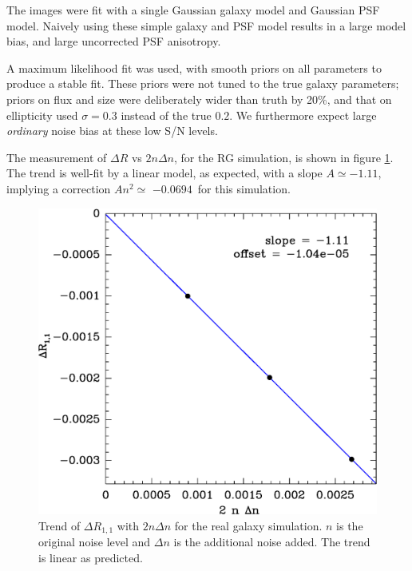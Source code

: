 \documentclass[usegraphicx,usenatbib]{mn2e}
\newcommand{\Aslope}{$-1.11$}
\newcommand{\Rcorr}{$-0.0694$}
\begin{document}
The images were fit with a single Gaussian galaxy model and Gaussian PSF model.
Naively using these simple galaxy and PSF model results in a large model bias,
and large uncorrected PSF anisotropy.

A maximum likelihood fit was used, with smooth priors on all parameters to
produce a stable fit.  These priors were not tuned to the true galaxy
parameters; priors on flux and size were deliberately wider than truth by 20\%,
and that on ellipticity used $\sigma=0.3$ instead of the true $0.2$.  We
furthermore expect large {\em ordinary} noise bias at these low S/N levels.

The measurement of $\Delta R$ vs $2 n \Delta n$, for the RG simulation, is
shown in figure \ref{fig:detrend}.  The trend is well-fit by a linear model, as
expected, with a slope $A \simeq $\Aslope, implying a correction $A n^2 \simeq$
\Rcorr\ for this simulation.

\begin{figure}
    \includegraphics[scale=0.45]{mcal-v14s01-Rnoise-detrend-R11.eps}

    \caption{Trend of $\Delta R_{1,1}$ with $2 n \Delta n$ for the
        real galaxy simulation.   $n$ is the
    original noise level and $\Delta n$ is the additional noise added.  The
    trend is linear as predicted.}

\label{fig:detrend}
\end{figure}
\end{document}

